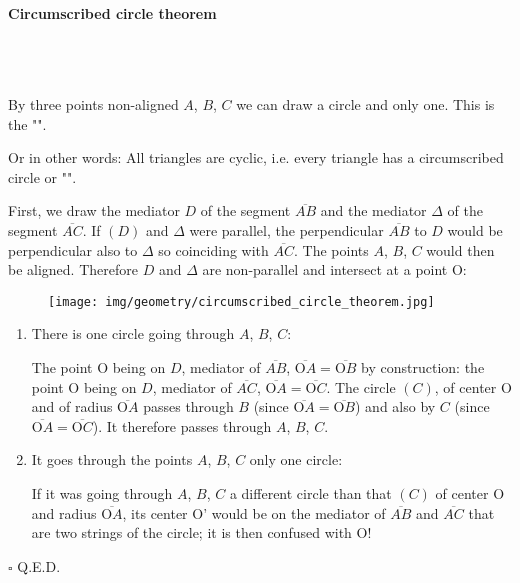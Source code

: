 	\pagebreak
	\paragraph{Circumscribed circle theorem}\mbox{}\\\\
	\begin{theorem}
	By three points non-aligned $A$, $B$, $C$ we can draw a circle and only one. This is the "".
	
	Or in other words: All triangles are cyclic, i.e. every triangle has a circumscribed circle or "".
	\end{theorem}
	\begin{dem}
	 First, we draw the mediator $D$ of  the segment  $\overline{AB} $ and the mediator $\Delta$ of  the segment $\overline{AC}$. If $(D)$ and $\Delta$ were parallel, the perpendicular $\overline{AB}$ to $D$ would be perpendicular also to $\Delta$ so coinciding with $\overline{AC}$. The points $A$, $B$, $C$ would then be aligned. Therefore $D$ and $\Delta$ are non-parallel and intersect at a point O:
	\begin{figure}[H]
		\centering
		\texttt{[image: img/geometry/circumscribed\_circle\_theorem.jpg]}
	\end{figure}
	\begin{enumerate}
		\item There is one circle going through $A$, $B$, $C$:

		The point O being on $D$, mediator of $\overline{AB}$, $\overline{\text{O}A} = \overline{\text{O}B}$ by construction:  the point O being on $D$, mediator of $\overline{AC}$, $\overline{\text{O}A} = \overline{\text{O}C}$. The circle $(C)$, of center O and of radius $\overline{\text{O}A}$ passes through $B$ (since  $\overline{\text{O}A} = \overline{\text{O}B}$) and also by $C$ (since $\overline{\text{O}A} = \overline{\text{O}C}$). It therefore passes through $A$, $B$, $C$.

		\item It goes through the points $A$, $B$, $C$ only one circle: 

		If it was going through $A$, $B$, $C$ a different circle than that $(C)$ of center O and radius $\overline{\text{O}A}$, its center O' would be on the mediator of $\overline{AB}$ and $\overline{AC}$ that are two strings of the circle; it is then confused with O!
	\end{enumerate}
	\begin{flushright}
		$\square$  Q.E.D.
	\end{flushright}
	\end{dem}
